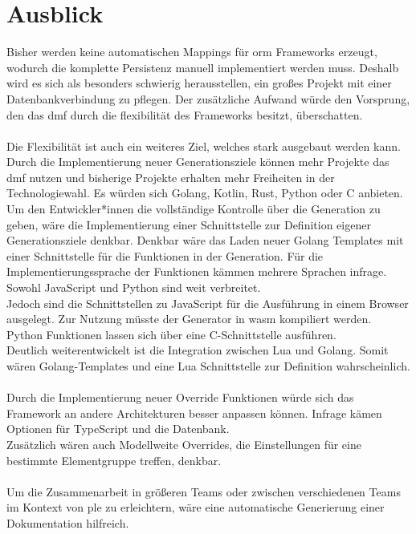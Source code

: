 \documentclass[./einleitung.tex]{subfiles}
\begin{document}
\section{Ausblick}\label{sec:ausblick}
Bisher werden keine automatischen Mappings für \acrshort{orm} Frameworks erzeugt, wodurch die komplette Persistenz manuell implementiert werden muss.
    Deshalb wird es sich als besonders schwierig herausstellen, ein großes Projekt mit einer Datenbankverbindung zu pflegen.
    Der zusätzliche Aufwand würde den Vorsprung, den das \acrshort{dmf} durch die flexibilität des Frameworks besitzt, überschatten.
    \\\\
    Die Flexibilität ist auch ein weiteres Ziel, welches stark ausgebaut werden kann.
    Durch die Implementierung neuer Generationsziele können mehr Projekte das \acrshort{dmf} nutzen und bisherige Projekte erhalten mehr Freiheiten in der Technologiewahl.
    Es würden sich Golang, Kotlin, Rust, Python oder C anbieten.\\
    Um den Entwickler*innen die vollständige Kontrolle über die Generation zu geben, wäre die Implementierung einer Schnittstelle zur Definition eigener Generationsziele denkbar.
    Denkbar wäre das Laden neuer Golang Templates mit einer Schnittstelle für die Funktionen in der Generation.
    Für die Implementierungssprache der Funktionen kämmen mehrere Sprachen infrage.
    Sowohl JavaScript und Python sind weit verbreitet.\\
    Jedoch sind die Schnittstellen zu JavaScript für die Ausführung in einem Browser ausgelegt.
    Zur Nutzung müsste der Generator in \acrfull{wasm} kompiliert werden.\\
    Python Funktionen lassen sich über eine C-Schnittstelle ausführen.\\
    Deutlich weiterentwickelt ist die Integration zwischen Lua und Golang.
    Somit wären Golang-Templates und eine Lua Schnittstelle zur Definition wahrscheinlich.
    \\\\
    Durch die Implementierung neuer Override Funktionen würde sich das Framework an andere Architekturen besser anpassen können.
    Infrage kämen Optionen für TypeScript und die Datenbank.\\
    Zusätzlich wären auch Modellweite Overrides, die Einstellungen für eine bestimmte Elementgruppe treffen, denkbar.
    \\\\
    Um die Zusammenarbeit in größeren Teams oder zwischen verschiedenen Teams im Kontext von \acrshort{ple} zu erleichtern, wäre eine automatische Generierung einer Dokumentation hilfreich.
\end{document}
